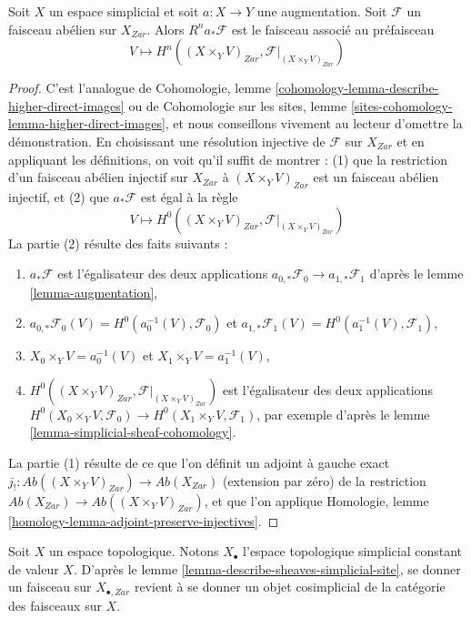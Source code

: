 \begin{lemma}
\label{lemma-augmentation-pushforward-higher-direct-image}
Soit $X$ un espace simplicial et soit $a : X \to Y$
une augmentation. Soit $\mathcal{F}$ un faisceau abélien
sur $X_{Zar}$. Alors $R^na_*\mathcal{F}$ est le faisceau associé
au préfaisceau
$$
V \longmapsto H^n((X \times_Y V)_{Zar}, \mathcal{F}|_{(X \times_Y V)_{Zar}})
$$
\end{lemma}

\begin{proof}
C'est l'analogue de
Cohomologie, lemme \ref{cohomology-lemma-describe-higher-direct-images} ou de
Cohomologie sur les sites, lemme \ref{sites-cohomology-lemma-higher-direct-images},
et nous conseillons vivement au lecteur d'omettre la démonstration.
En choisissant une résolution injective de $\mathcal{F}$ sur
$X_{Zar}$ et en appliquant les définitions, on voit qu'il suffit de montrer :
(1) que la restriction d'un faisceau abélien injectif
sur $X_{Zar}$ à $(X \times_Y V)_{Zar}$ est un faisceau abélien injectif, et
(2) que $a_*\mathcal{F}$ est égal à la règle
$$
V \longmapsto H^0((X \times_Y V)_{Zar}, \mathcal{F}|_{(X \times_Y V)_{Zar}})
$$
La partie (2) résulte des faits suivants :
\begin{enumerate}
\item[(2a)] $a_*\mathcal{F}$ est l'égalisateur des deux applications
$a_{0, *}\mathcal{F}_0 \to a_{1, *}\mathcal{F}_1$
d'après le lemme \ref{lemma-augmentation},
\item[(2b)] $a_{0, *}\mathcal{F}_0(V) =
H^0(a_0^{-1}(V), \mathcal{F}_0)$ et
$a_{1, *}\mathcal{F}_1(V) = H^0(a_1^{-1}(V), \mathcal{F}_1)$,
\item[(2c)] $X_0 \times_Y V = a_0^{-1}(V)$ et $X_1 \times_Y V = a_1^{-1}(V)$,
\item[(2d)] $H^0((X \times_Y V)_{Zar}, \mathcal{F}|_{(X \times_Y V)_{Zar}})$
est l'égalisateur des deux applications
$H^0(X_0 \times_Y V, \mathcal{F}_0) \to H^0(X_1 \times_Y V, \mathcal{F}_1)$,
par exemple d'après le lemme \ref{lemma-simplicial-sheaf-cohomology}.
\end{enumerate}
La partie (1) résulte de ce que l'on définit un adjoint à gauche exact
$j_! : \textit{Ab}((X \times_Y V)_{Zar}) \to \textit{Ab}(X_{Zar})$
(extension par zéro) de la restriction
$\textit{Ab}(X_{Zar}) \to \textit{Ab}((X \times_Y V)_{Zar})$,
et que l'on applique Homologie, lemme \ref{homology-lemma-adjoint-preserve-injectives}.
\end{proof}

\noindent
Soit $X$ un espace topologique. Notons $X_\bullet$ l'espace topologique
simplicial constant de valeur $X$. D'après le
lemme \ref{lemma-describe-sheaves-simplicial-site},
se donner un faisceau sur $X_{\bullet, Zar}$ revient à se
donner un objet cosimplicial de la catégorie des faisceaux sur $X$.

